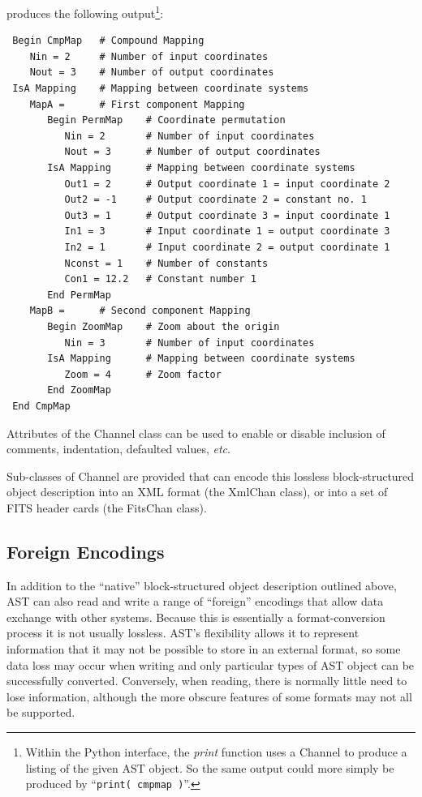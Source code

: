 \documentclass[final,authoryear,5p,times,twocolumn]{elsarticle}
\begin{document}
produces the following output\footnote{Within the Python interface, the
\emph{print} function uses a Channel to produce a listing of the given
AST object. So the same output could more simply be produced by
``\texttt{print( cmpmap )}''.}:

\scriptsize
\begin{verbatim}
 Begin CmpMap   # Compound Mapping
    Nin = 2     # Number of input coordinates
    Nout = 3    # Number of output coordinates
 IsA Mapping    # Mapping between coordinate systems
    MapA =      # First component Mapping
       Begin PermMap    # Coordinate permutation
          Nin = 2       # Number of input coordinates
          Nout = 3      # Number of output coordinates
       IsA Mapping      # Mapping between coordinate systems
          Out1 = 2      # Output coordinate 1 = input coordinate 2
          Out2 = -1     # Output coordinate 2 = constant no. 1
          Out3 = 1      # Output coordinate 3 = input coordinate 1
          In1 = 3       # Input coordinate 1 = output coordinate 3
          In2 = 1       # Input coordinate 2 = output coordinate 1
          Nconst = 1    # Number of constants
          Con1 = 12.2   # Constant number 1
       End PermMap
    MapB =      # Second component Mapping
       Begin ZoomMap    # Zoom about the origin
          Nin = 3       # Number of input coordinates
       IsA Mapping      # Mapping between coordinate systems
          Zoom = 4      # Zoom factor
       End ZoomMap
 End CmpMap
\end{verbatim}
\normalsize

Attributes of the Channel class can be used to enable or disable
inclusion of comments, indentation, defaulted values, \emph{etc}.

Sub-classes of Channel are provided that can encode this lossless
block-structured object description into an XML format (the XmlChan
class), or into a set of FITS header cards (the FitsChan class).

\subsection{Foreign Encodings}

In addition to the ``native'' block-structured object description outlined
above, AST can also read and write a range of ``foreign'' encodings that
allow data exchange with other systems. Because this is essentially a
format-conversion process it is not usually lossless. AST's flexibility
allows it to represent information that it may not be possible to store
in an external format, so some data loss may occur when writing and only
particular types of AST object can be successfully converted. Conversely,
when reading, there is normally little need to lose information, although
the more obscure features of some formats may not all be supported.
\end{document}
